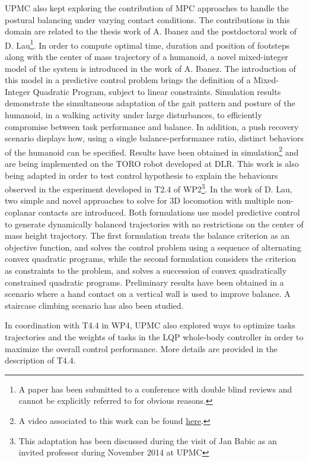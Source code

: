 UPMC also kept exploring the contribution of MPC approaches to  handle the postural balancing under varying contact conditions. The contributions in this domain are related to the thesis work of A. Ibanez \cite{ibanezIROS2014} and the postdoctoral work of D. Lau\footnote{A paper has been submitted to a conference with double blind reviews and cannot be explicitly referred to for obvious reasons.}.  In order to compute optimal time, duration and position of footsteps along with the center of mass trajectory of a humanoid, a novel mixed-integer model of the system is introduced in the work of A. Ibanez. The introduction of this model in a predictive control problem brings the definition of a Mixed-Integer Quadratic Program, subject to linear constraints. Simulation results demonstrate the simultaneous adaptation of the gait pattern and posture of the humanoid, in a walking activity under large disturbances, to efficiently compromise between task performance and balance. In addition, a push recovery scenario displays how, using a single balance-performance ratio, distinct behaviors of the humanoid can be specified. Results have been obtained in simulation\footnote{A video associated to this work can be found \href{http://pages.isir.upmc.fr/~padois/website/fichiers/videos/ibanez\_IROS2014.mp4}{here}.} and are being implemented on the TORO robot developed at DLR. This work is also being adapted in order to test control hypothesis to explain  the behaviours observed in the experiment developed in T2.4 of WP2\footnote{This adaptation has been discussed during the visit of Jan Babic as an invited professor during November 2014 at  UPMC}. In the work of D. Lau, two simple and novel approaches to solve for 3D locomotion with multiple non-coplanar contacts are introduced. Both formulations use model predictive control to generate dynamically balanced trajectories with no restrictions on the center of mass height trajectory. The first formulation treats the balance criterion as an objective function, and solves the control problem using a sequence of alternating convex quadratic programs, while the second formulation considers the criterion as constraints to the problem, and solves a succession of convex quadratically constrained quadratic programs. Preliminary results have been obtained in a scenario where a hand contact on a vertical wall is used to improve balance. A staircase climbing scenario has also been studied.

In coordination with T4.4 in WP4, UPMC also explored ways to optimize tasks trajectories \cite{lober-HUMANOIDS2014} and the weights of tasks \cite{lobersubmittedIROS2015} in the LQP whole-body controller in order to maximize the overall control performance. More details are provided in the description of T4.4.\\

